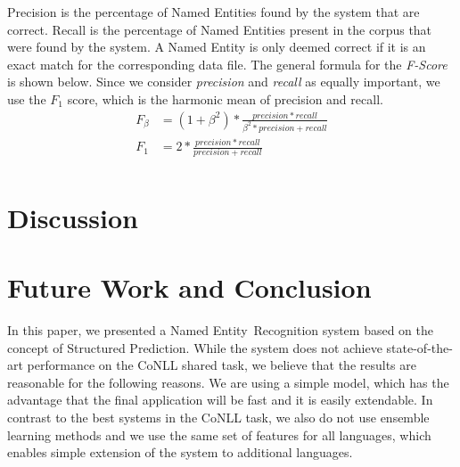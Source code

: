 \documentclass[11pt]{article}
\newcommand{\namedentity}{Named Entity}
\begin{document}
Precision is the percentage of Named Entities found by the system that are correct. Recall is the percentage of Named Entities present in the corpus that were 
found by the system. A Named Entity is only deemed correct if it is an exact match for the corresponding data file. The general formula for the \emph{F-Score} 
is shown below. Since we consider \emph{precision} and \emph{recall} as equally important, we use the $F_{1}$ score, which is the harmonic mean of precision and recall.
\begin{align*}
  F_{\beta} &=  (1+\beta^2)*\frac{precision *recall}{\beta^2* precision + recall}\\
  F_1       &= 2*\frac{precision *recall}{precision + recall}\\
\end{align*}





\section{Discussion}


\section{Future Work and Conclusion}

In this paper, we presented a \namedentity~Recognition system based on the concept of Structured Prediction. 
While the system does not achieve state-of-the-art performance on the CoNLL shared task, we believe that the results 
are reasonable for the following reasons. We are using a simple model, which has the advantage that the final application 
will be fast and it is easily extendable. In contrast to the best systems in the CoNLL task, we also do not use ensemble 
learning methods and we use the same set of features for all languages, which enables simple extension of the system to additional languages.



 




\end{document}
